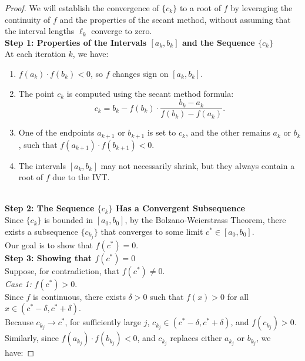 \documentclass{article}
\begin{document}
\begin{proof}
We will establish the convergence of \( \{ c_k \} \) to a root of \( f \) by leveraging the continuity of \( f \) and the properties of the secant method, without assuming that the interval lengths \( \ell_k \) converge to zero.
\\
\textbf{Step 1: Properties of the Intervals \( [a_k, b_k] \) and the Sequence \( \{ c_k \} \)}
\\
At each iteration \( k \), we have:
\\
\begin{enumerate}
    \item \( f(a_k) \cdot f(b_k) < 0 \), so \( f \) changes sign on \( [a_k, b_k] \).
    \item The point \( c_k \) is computed using the secant method formula:
    \[
        c_k = b_k - f(b_k) \cdot \frac{b_k - a_k}{f(b_k) - f(a_k)}.
    \]
    \item One of the endpoints \( a_{k+1} \) or \( b_{k+1} \) is set to \( c_k \), and the other remains \( a_k \) or \( b_k \), such that \( f(a_{k+1}) \cdot f(b_{k+1}) < 0 \).
    \item The intervals \( [a_k, b_k] \) may not necessarily shrink, but they always contain a root of \( f \) due to the IVT.
\end{enumerate}
\\
\textbf{Step 2: The Sequence \( \{ c_k \} \) Has a Convergent Subsequence}
\\
Since \( \{ c_k \} \) is bounded in \( [a_0, b_0] \), by the Bolzano-Weierstrass Theorem, there exists a subsequence \( \{ c_{k_j} \} \) that converges to some limit \( c^\ast \in [a_0, b_0] \).
\\
Our goal is to show that \( f(c^\ast) = 0 \).
\\
\textbf{Step 3: Showing that \( f(c^\ast) = 0 \)}
\\
Suppose, for contradiction, that \( f(c^\ast) \neq 0 \).
\\
\textit{Case 1:} \( f(c^\ast) > 0 \).
\\
Since \( f \) is continuous, there exists \( \delta > 0 \) such that \( f(x) > 0 \) for all \( x \in (c^\ast - \delta, c^\ast + \delta) \).
\\
Because \( c_{k_j} \to c^\ast \), for sufficiently large \( j \), \( c_{k_j} \in (c^\ast - \delta, c^\ast + \delta) \), and \( f(c_{k_j}) > 0 \).
\\
Similarly, since \( f(a_{k_j}) \cdot f(b_{k_j}) < 0 \), and \( c_{k_j} \) replaces either \( a_{k_j} \) or \( b_{k_j} \), we have:

\end{proof}
\end{document}
